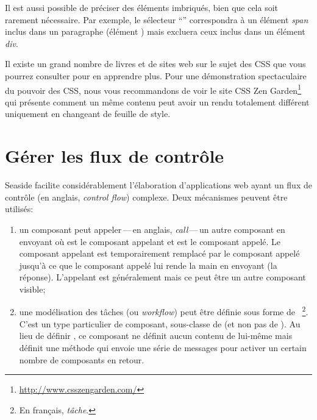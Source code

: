 \documentclass[a4paper,10pt,twoside]{book}
\begin{document}
Il est aussi possible de préciser des éléments imbriqués, bien que
cela soit rarement nécessaire. Par exemple, le sélecteur
``'' correspondra à un élément \emph{span} inclus dans un
paragraphe (élément ) mais excluera ceux inclus dans un élément
\emph{div}.

Il existe un grand nombre de livres et de sites web sur le sujet des
CSS que vous pourrez consulter pour en apprendre plus.
Pour une démonstration spectaculaire du pouvoir des CSS, nous vous
recommandons de voir le site CSS Zen
Garden\footnote{\url{http://www.csszengarden.com/}} qui présente
comment un même contenu peut avoir un rendu totalement différent
uniquement en changeant de feuille de style.

\section{Gérer les flux de contrôle} %

Seaside facilite considérablement l'élaboration d'applications web
ayant un flux de contrôle (en anglais, \emph{control flow}) complexe.
Deux mécanismes peuvent être utilisés:

\begin{enumerate}
  \item un composant peut appeler\,---\,en anglais,
    \emph{call}\,---\,un autre composant en envoyant
où  est le composant appelant et  est le
composant appelé.
Le composant appelant est temporairement remplacé par le composant
appelé jusqu'à ce que le composant appelé lui rende la main
  en envoyant  (\ie la réponse).
L'appelant est généralement  mais ce peut être un autre
composant visible;
  \item une modélisation des tâches (ou \emph{workflow}) peut être définie
    sous forme de ~\footnote{En
      français, \emph{tâche}.}.
    C'est un type particulier de composant, sous-classe de
     (et non pas de ).
Au lieu de définir , ce composant ne définit
aucun contenu de lui-même mais définit une méthode  qui envoie
une série de messages  pour activer un certain nombre de
composants en retour.
\end{enumerate}
\end{document}
